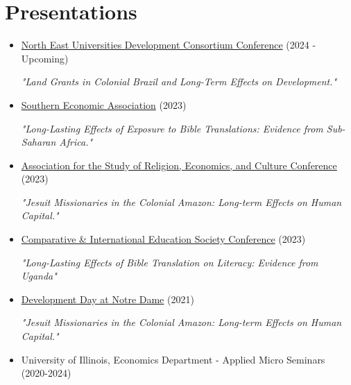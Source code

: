 \documentclass[letterpaper,11pt]{article}
\begin{document}
\section{Presentations}
\begin{adjustwidth}{3mm}{0mm}
  \begin{itemize}
    \item \href{https://cssh.northeastern.edu/gap/neudc-2024/}{North East Universities Development Consortium Conference} (2024 - Upcoming) 
    
    \textit{"Land Grants in Colonial Brazil and Long-Term Effects on Development."}
  \end{itemize}

  \begin{itemize}
    \item \href{https://www.southerneconomic.org/event/7662b305-ad92-474d-8f2c-bce1240b9858/websitePage:e0a9d079-18e0-4413-a0b6-32f8f6b51e64}{Southern Economic Association} (2023) 
    
    \textit{"Long-Lasting Effects of Exposure to Bible Translations: Evidence from Sub-Saharan Africa."}
  \end{itemize}

  \begin{itemize}
    \item \href{http://www.asrec.org/conferences/}{Association for the Study of Religion, Economics, and Culture Conference} (2023) 
    
    \textit{"Jesuit Missionaries in the Colonial Amazon: Long-term Effects on Human Capital."}
  \end{itemize}

  \begin{itemize}
    \item \href{https://cies2023.org/}{Comparative \& International Education Society Conference} (2023) 
    
    \textit{"Long-Lasting Effects of Bible Translation on Literacy: Evidence from Uganda"}
  \end{itemize}

  \begin{itemize}
    \item \href{https://kellogg.nd.edu/development-day-2021#tab-2998}{Development Day at Notre Dame} (2021) 
    
    \textit{"Jesuit Missionaries in the Colonial Amazon: Long-term Effects on Human Capital."}
  \end{itemize}

  \begin{itemize}
    \item University of Illinois, Economics Department - Applied Micro Seminars (2020-2024)
  \end{itemize}
\end{adjustwidth}
\end{document}
